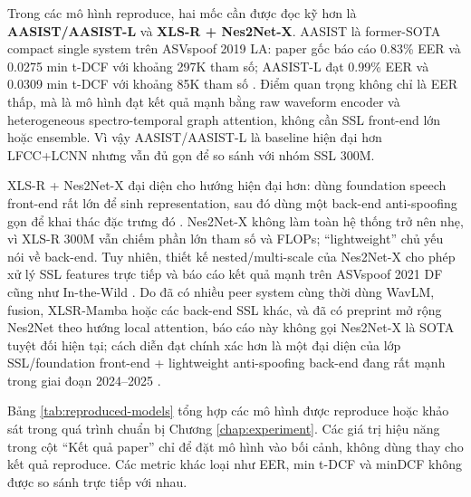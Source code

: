 Trong các mô hình reproduce, hai mốc cần được đọc kỹ hơn là \textbf{AASIST/AASIST-L} và \textbf{XLS-R + Nes2Net-X}. AASIST là former-SOTA compact single system trên ASVspoof 2019 LA: paper gốc báo cáo 0.83\% EER và 0.0275 min t-DCF với khoảng 297K tham số; AASIST-L đạt 0.99\% EER và 0.0309 min t-DCF với khoảng 85K tham số \cite{aasist}. Điểm quan trọng không chỉ là EER thấp, mà là mô hình đạt kết quả mạnh bằng raw waveform encoder và heterogeneous spectro-temporal graph attention, không cần SSL front-end lớn hoặc ensemble. Vì vậy AASIST/AASIST-L là baseline hiện đại hơn LFCC+LCNN nhưng vẫn đủ gọn để so sánh với nhóm SSL 300M.

XLS-R + Nes2Net-X đại diện cho hướng hiện đại hơn: dùng foundation speech front-end rất lớn để sinh representation, sau đó dùng một back-end anti-spoofing gọn để khai thác đặc trưng đó \cite{xlsr,nes2net}. Nes2Net-X không làm toàn hệ thống trở nên nhẹ, vì XLS-R 300M vẫn chiếm phần lớn tham số và FLOPs; ``lightweight'' chủ yếu nói về back-end. Tuy nhiên, thiết kế nested/multi-scale của Nes2Net-X cho phép xử lý SSL features trực tiếp và báo cáo kết quả mạnh trên ASVspoof 2021 DF cũng như In-the-Wild \cite{nes2net}. Do đã có nhiều peer system cùng thời dùng WavLM, fusion, XLSR-Mamba hoặc các back-end SSL khác, và đã có preprint mở rộng Nes2Net theo hướng local attention, báo cáo này không gọi Nes2Net-X là SOTA tuyệt đối hiện tại; cách diễn đạt chính xác hơn là một đại diện của lớp SSL/foundation front-end + lightweight anti-spoofing back-end đang rất mạnh trong giai đoạn 2024--2025 \cite{xlsr_mamba,multiapi_spoof}.

Bảng \ref{tab:reproduced-models} tổng hợp các mô hình được reproduce hoặc khảo sát trong quá trình chuẩn bị Chương \ref{chap:experiment}. Các giá trị hiệu năng trong cột ``Kết quả paper'' chỉ để đặt mô hình vào bối cảnh, không dùng thay cho kết quả reproduce. Các metric khác loại như EER, min t-DCF và minDCF không được so sánh trực tiếp với nhau.

